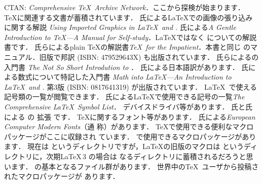 \begin{KI}
  CTAN: \emph{Comprehensive \TeX\ Archive Network}．ここから探検が始まります．
  \TeX に関連する文書が蓄積されています．
 氏による\LaTeX での画像の張り込みに関する解説
  \emph{Using Imported Graphics in \LaTeX\ and \PDFLaTeX.}
 氏による\emph{A Gentle Introduction to \TeX---A
  Manual for Self-study}．\LaTeX ではなく
 についての解説書です．
 氏らによるplain \TeX の解説書\emph{\TeX\ for the
  Impatient}．本書と同じ \emph{\thefdl} のマニュアル．旧版で邦訳 (ISBN:
  479529643X) も出版されています．
 氏らによる\LaTeXe の入門書
 \emph{The Not So Short Introdution to \LaTeXe}．
 氏による日本語訳があります．
 氏による数式について特記した入門書
 \emph{Math into \LaTeX---An Introduction to \LaTeX\ and \AmSLaTeX.}
 第3版 (ISBN: 0817641319) が出版されています．
 \LaTeX\ で使える記号類の一覧が閲覧できます．
  氏による\LaTeX で使用できる記号の一覧\emph{The
  Comprehensive \LaTeX\ Symbol List}．
 デバイスドライバ等があります．
 氏と氏による \Dvipdfm の
  拡張 \Dvipdfmx です．
 \TeX に関するフォント等があります．
 氏による\emph{European Computer Modern Fonts}（通
  称）があります．
 \TeX で使用できる便利なマクロパッケージがここに収録され
  ています．
 \LaTeXe で使用できるマクロパッケージがあります．
 現在は というディレクトリですが，\LaTeX の旧版のマクロは
 というディレクトリに，次期\LaTeX\,3 の場合は 
 なるディレクトリに蓄積されるだろうと思います．
 \LaTeXe の基本となるファイル群があります．
 世界中の\TeX\ ユーザから投稿されたマクロパッケージが
  あります．

\end{KI}

